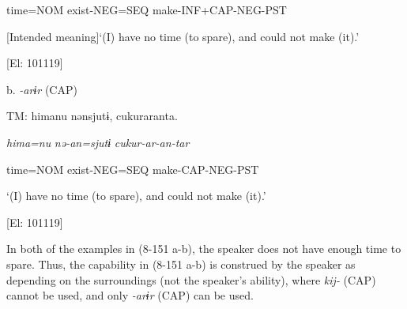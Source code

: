     time=NOM  exist-NEG=SEQ  make-INF+CAP-NEG-PST

    [Intended meaning]‘(I) have no time (to spare), and could not make (it).’

    [El: 101119]

  b. \textit{{}-arɨr} (CAP)

  TM:  himanu  nənsjutɨ,  cukuraranta.

    \textit{hima=nu}  \textit{nə-an=sjutɨ}  \textit{cukur-ar{}-an-tar}

    time=NOM  exist-NEG=SEQ  make-CAP-NEG-PST

    ‘(I) have no time (to spare), and could not make (it).’

    [El: 101119]

In both of the examples in (8-151 a-b), the speaker does not have enough time to spare. Thus, the capability in (8-151 a-b) is construed by the speaker as depending on the surroundings (not the speaker’s ability), where \textit{kij-} (CAP) cannot be used, and only \textit{{}-arɨr} (CAP) can be used.
